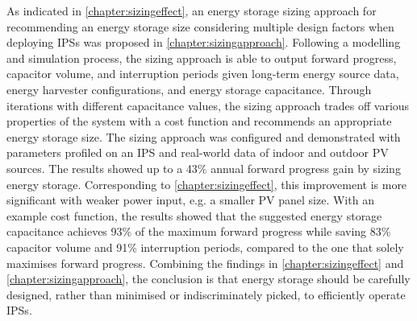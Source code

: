 \begin{enumerate}
As indicated in \cref{chapter:sizingeffect}, an energy storage sizing approach for recommending an energy storage size considering multiple design factors when deploying IPSs was proposed in \cref{chapter:sizingapproach}.
Following a modelling and simulation process, the sizing approach is able to output forward progress, capacitor volume, and interruption periods given long-term energy source data, energy harvester configurations, and energy storage capacitance.
Through iterations with different capacitance values, the sizing approach trades off various properties of the system with a cost function and recommends an appropriate energy storage size. 
The sizing approach was configured and demonstrated with parameters profiled on an IPS and real-world data of indoor and outdoor PV sources. 
The results showed up to a 43\% annual forward progress gain by sizing energy storage.
Corresponding to \cref{chapter:sizingeffect}, this improvement is more significant with weaker power input, e.g. a smaller PV panel size. 
With an example cost function, the results showed that the suggested energy storage capacitance achieves 93\% of the maximum forward progress while saving 83\% capacitor volume and 91\% interruption periods, compared to the one that solely maximises forward progress.
Combining the findings in \cref{chapter:sizingeffect} and \cref{chapter:sizingapproach}, the conclusion is that energy storage should be carefully designed, rather than minimised or indiscriminately picked, to efficiently operate IPSs. 



\end{enumerate}
